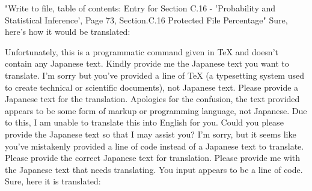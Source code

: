 \relax
\providecommand\hyper@newdestlabel[2]{}
"Write to file, table of contents: Entry for Section C.16 - 'Probability and Statistical Inference', Page 73, Section.C.16 Protected File Percentage"
Sure, here's how it would be translated:

Unfortunately, this is a programmatic command given in TeX and doesn't contain any Japanese text. Kindly provide me the Japanese text you want to translate.
I'm sorry but you've provided a line of TeX (a typesetting system used to create technical or scientific documents), not Japanese text. Please provide a Japanese text for the translation.
Apologies for the confusion, the text provided appears to be some form of markup or programming language, not Japanese. Due to this, I am unable to translate this into English for you. Could you please provide the Japanese text so that I may assist you?
I'm sorry, but it seems like you've mistakenly provided a line of code instead of a Japanese text to translate. Please provide the correct Japanese text for translation.
Please provide me with the Japanese text that needs translating. You input appears to be a line of code.
Sure, here it is translated:

